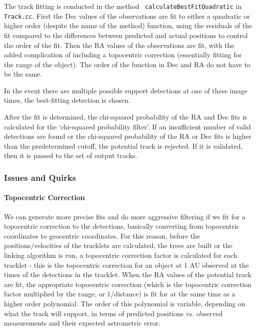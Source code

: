 The track fitting is conducted in the method {\tt
  calculateBestFitQuadratic} in {\tt Track.cc}. First the Dec values
of the observations are fit to either a quadratic or higher order
(despite the name of the method) function, using the residuals of the
fit compared to the differences between predicted and actual positions to
control the order of the fit. Then the RA values of the observations
are fit, with the added complication of including a topocentric
correction (essentially fitting for the range of the object). 
The order of the function in Dec and RA do not have to be the same.  

In the event there are multiple possible support detections at one of
these image times, the best-fitting detection is chosen. 

After the fit is determined, the chi-squared probability of the RA and
Dec fits is calculated for the `chi-squared probability filter'.  If
an insufficient number of valid detections are found or the
chi-squared probability of the RA or Dec fits is higher than the
predetermined cutoff, the potential track is rejected.  If it is
validated, then it is passed to the set of output tracks.

\subsubsection{Issues and Quirks}
\label{someLinkingIssues}

\paragraph{Topocentric Correction}
We can generate more precise fits and do more aggressive filtering if we fit for a
topocentric correction to the detections, basically converting from topocentric
coordinates to geocentric coordinates. For this reason, before the positions/velocities of the
tracklets are calculated, the trees are built or the linking algorithm
is run, a topocentric correction factor is calculated for each
tracklet - this is the topocentric correction for an object at 1 AU observed at the times 
of the detections in the tracklet. When the RA values of the potential track are fit, the appropriate 
topocentric correction (which is the topocentric correction factor multiplied by the range, or 1/distance)
is fit for at the same time as a higher order polynomial. The order of this polynomial is variable,
depending on what the track will support, in terms of predicted positions vs. observed measurements and their 
expected astrometric error. 

